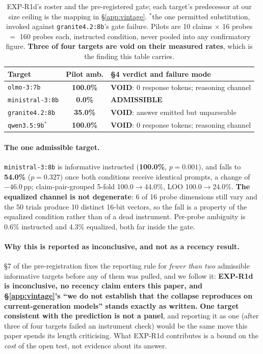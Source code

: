 \begin{table}[h]
\centering
\small
\begin{tabular}{@{}lcl@{}}
\toprule
\textbf{Target} & \textbf{Pilot amb.} & \textbf{§4 verdict and failure mode} \\
\midrule
\texttt{olmo-3:7b}         & \textbf{100.0\%}          & \textbf{VOID}: 0 response tokens; reasoning channel \\
\texttt{ministral-3:8b}    & \phantom{0}\textbf{0.0\%} & \textbf{ADMISSIBLE} \\
\texttt{granite4.2:8b}     & \phantom{0}\textbf{35.0\%} & \textbf{VOID}: answer emitted but unparseable \\
\texttt{qwen3.5:9b}$^\ast$ & \textbf{100.0\%}          & \textbf{VOID}: 0 response tokens; reasoning channel \\
\bottomrule
\end{tabular}
\caption{EXP-R1d's roster and the pre-registered gate; each target's predecessor at our size ceiling is the mapping in §\ref{app:vintage}. $^\ast$the one permitted substitution, invoked against \texttt{granite4.2:8b}'s gate failure. Pilots are 10 claims $\times$ 16 probes $=$ 160 probes each, instructed condition, never pooled into any confirmatory figure. \textbf{Three of four targets are void on their measured rates}, which is the finding this table carries.}
\label{tab:r1d}
\end{table}

\paragraph{The one admissible target.} \texttt{ministral-3:8b} is informative instructed (\textbf{100.0\%}, $p=0.001$), and falls to \textbf{54.0\%} ($p=0.327$) once both conditions receive identical prompts, a change of $-46.0$\,pp; claim-pair-grouped 5-fold 100.0$\to$44.0\%, LOO 100.0$\to$24.0\%. \textbf{The equalized channel is not degenerate}: 6 of 16 probe dimensions still vary and the 50 trials produce 10 distinct 16-bit vectors, so the fall is a property of the equalized condition rather than of a dead instrument. Per-probe ambiguity is 0.6\% instructed and 4.3\% equalized, both far inside the gate.

\paragraph{Why this is reported as inconclusive, and not as a recency result.} §7 of the pre-registration fixes the reporting rule for \emph{fewer than two} admissible informative targets before any of them was pulled, and we follow it: \textbf{EXP-R1d is inconclusive, no recency claim enters this paper, and §\ref{app:vintage}'s ``we do not establish that the collapse reproduces on current-generation models'' stands exactly as written.} \textbf{One target consistent with the prediction is not a panel}, and reporting it as one (after three of four targets failed an instrument check) would be the same move this paper spends its length criticising. What EXP-R1d contributes is a bound on the \emph{cost} of the open test, not evidence about its answer.

